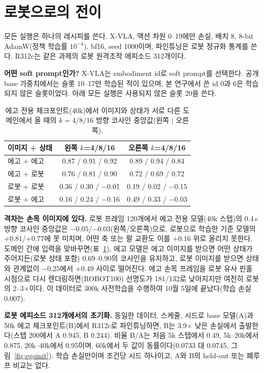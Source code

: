\documentclass[conference,10pt]{IEEEtran}
\begin{document}
\section{로봇으로의 전이}\label{sec:transfer}
모든 실행은 하나의 레시피를 쓴다. X-VLA, 액션 차원 0--19에만 손실, 배치 8, 8-bit AdamW(정책 학습률 $10^{-4}$), bf16, seed 1000이며,
파인튜닝은 로봇 정규화 통계를 쓴다. R312c는 같은 과제의 로봇 원격조작 에피소드 312개이다.

\textbf{어떤 soft prompt인가?} X-VLA는 embodiment id로 soft prompt를 선택한다. 공개 base 가중치에서는 슬롯 10--17만 학습된 적이
있으며, 본 연구에서 쓴 id 0과 6은 학습되지 않은 슬롯이었다. 아래 모든 실행은 사용되지 않은 슬롯 20을 쓴다.

\begin{table}[t]
\centering\footnotesize\setlength{\tabcolsep}{3.2pt}
\caption{에고 전용 체크포인트(40k)에서 이미지와 상태가 서로 다른 도메인에서 올 때의 $k{=}4/8/16$ 방향 코사인 중앙값(왼쪽 $|$
오른쪽).}
\label{tab:ablation}
\begin{tabular}{@{}lcc@{}}
\toprule
이미지 + 상태 & 왼쪽 $k$=4/8/16 & 오른쪽 $k$=4/8/16 \\
\midrule
에고 + 에고 & 0.87 / 0.91 / 0.92 & 0.89 / 0.94 / 0.84 \\
에고 + 로봇 & 0.76 / 0.81 / 0.90 & 0.72 / 0.69 / 0.72 \\
로봇 + 로봇 & 0.36 / 0.30 / $-$0.01 & 0.19 / 0.02 / $-$0.15 \\
로봇 + 에고 & 0.16 / 0.24 / $-$0.16 & 0.49 / 0.33 / $-$0.03 \\
\bottomrule
\end{tabular}
\end{table}

\textbf{격차는 손목 이미지에 있다.} 로봇 프레임 120개에서 에고 전용 모델(40k 스텝)의 0.4\,s 방향 코사인 중앙값은
$-0.05$/$-0.03$(왼쪽/오른쪽)으로, 로봇으로 학습한 기준 모델의 $+0.81$/$+0.77$에 못 미치며, 어떤 축 또는 팔 교환도 이를 $+0.16$ 위로
올리지 못한다. 도메인 간에 입력을 맞바꾸면(표~\ref{tab:ablation}), 에고 모델은 에고 이미지를 받으면 어떤 상태가 주어지든(로봇 상태
포함) 0.69--0.90의 코사인을 유지하고, 로봇 이미지를 받으면 상태와 관계없이 $-0.25$에서 $+0.49$ 사이로 떨어진다. 에고 손목 프레임을
로봇 유사 핀홀 시점으로 다시 렌더링하면(ROBOT100) 선명도가 181/132로 낮아지지만 여전히 로봇의 2--3$\times${}이다. 이 데이터로
300k 사전학습을 수행하여 10월 5일에 끝났다(학습 손실 0.007).

\textbf{로봇 에피소드 312개에서의 초기화.} 동일한 데이터, 스케줄, 시드로 base 모델(A)과 50k 에고 체크포인트(B)에서 R312c로
파인튜닝하면, B는 3.9$\times${} 낮은 손실에서 출발한다(스텝 200에서 A 0.945, B 0.244). 비율 B/A는 처음 5k 스텝에서 0.49,
5k--20k에서 0.875, 20k--40k에서 0.95이며, 60k에서 두 값이 동률이다(0.0733 대 0.0745, 그림~\ref{fig:egoinit}). 학습 손실만이며
조건당 시드 하나이고, A와 B의 held-out 또는 폐루프 비교는 없다.
\end{document}

